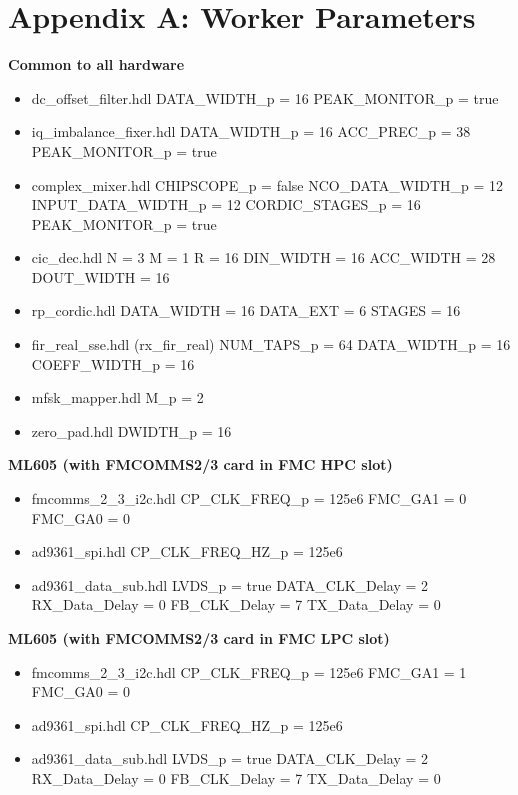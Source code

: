 \section{Appendix A: Worker Parameters}
\begin{minipage}[t]{.5\textwidth}
	\textbf{Common to all hardware}
	\begin{itemize}
		\item dc\_offset\_filter.hdl
			\subitem DATA\_WIDTH\_p = 16
			\subitem PEAK\_MONITOR\_p = true
		\item iq\_imbalance\_fixer.hdl
			\subitem DATA\_WIDTH\_p = 16
			\subitem ACC\_PREC\_p = 38
			\subitem PEAK\_MONITOR\_p = true
		\item complex\_mixer.hdl
			\subitem CHIPSCOPE\_p = false
			\subitem NCO\_DATA\_WIDTH\_p = 12
			\subitem INPUT\_DATA\_WIDTH\_p = 12
			\subitem CORDIC\_STAGES\_p = 16
			\subitem PEAK\_MONITOR\_p = true
		\item cic\_dec.hdl
			\subitem N = 3
			\subitem M = 1
			\subitem R = 16
			\subitem DIN\_WIDTH = 16
			\subitem ACC\_WIDTH = 28
			\subitem DOUT\_WIDTH = 16
		\item rp\_cordic.hdl
			\subitem DATA\_WIDTH = 16
			\subitem DATA\_EXT = 6
			\subitem STAGES = 16
		\item fir\_real\_sse.hdl (rx\_fir\_real)
			\subitem NUM\_TAPS\_p = 64
			\subitem DATA\_WIDTH\_p = 16
			\subitem COEFF\_WIDTH\_p = 16
		\item mfsk\_mapper.hdl
			\subitem M\_p = 2
		\item zero\_pad.hdl
			\subitem DWIDTH\_p = 16
	\end{itemize}
\end{minipage}
\begin{minipage}[t]{.5\textwidth}
	\textbf{ML605 (with FMCOMMS2/3 card in FMC HPC slot)}
	\begin{itemize}
		\item fmcomms\_2\_3\_i2c.hdl
			\subitem CP\_CLK\_FREQ\_p = 125e6
			\subitem FMC\_GA1 = 0
			\subitem FMC\_GA0 = 0
		\item ad9361\_spi.hdl
			\subitem CP\_CLK\_FREQ\_HZ\_p = 125e6
		\item ad9361\_data\_sub.hdl
			\subitem LVDS\_p = true
			\subitem DATA\_CLK\_Delay = 2
			\subitem RX\_Data\_Delay = 0
			\subitem FB\_CLK\_Delay = 7
			\subitem TX\_Data\_Delay = 0
	\end{itemize}
	\textbf{ML605 (with FMCOMMS2/3 card in FMC LPC slot)}
	\begin{itemize}
		\item fmcomms\_2\_3\_i2c.hdl
			\subitem CP\_CLK\_FREQ\_p = 125e6
			\subitem FMC\_GA1 = 1
			\subitem FMC\_GA0 = 0
		\item ad9361\_spi.hdl
			\subitem CP\_CLK\_FREQ\_HZ\_p = 125e6
		\item ad9361\_data\_sub.hdl
			\subitem LVDS\_p = true
			\subitem DATA\_CLK\_Delay = 2
			\subitem RX\_Data\_Delay = 0
			\subitem FB\_CLK\_Delay = 7
			\subitem TX\_Data\_Delay = 0
	\end{itemize}
\end{minipage}

